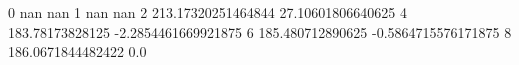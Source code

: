 0 nan nan
1 nan nan
2 213.17320251464844 27.10601806640625
4 183.78173828125 -2.2854461669921875
6 185.480712890625 -0.5864715576171875
8 186.0671844482422 0.0
